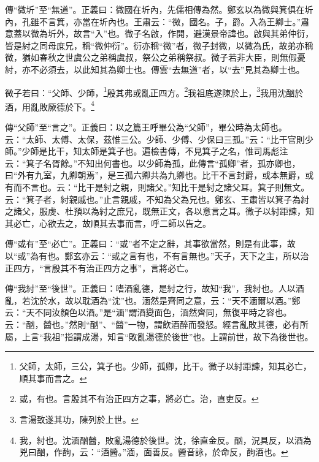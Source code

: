 {\noindent\zhuan{}\fzbyks 傳“微圻”至“無道”。正義曰：微國在圻內，先儒相傳為然。鄭玄以為微與箕俱在圻內，孔雖不言箕，亦當在圻內也。王肅云：“微，國名。子，爵。入為王卿士。”肅意蓋以微為圻外，故言“入”也。微子名啟，作開，避漢景帝諱也。啟與其弟仲衍，皆是紂之同母庶兄，稱“微仲衍”。衍亦稱“微”者，微子封微，以微為氏，故弟亦稱微，猶如春秋之世虞公之弟稱虞叔，祭公之弟稱祭叔。微子若非大臣，則無假憂紂，亦不必須去，以此知其為卿士也。傳雲“去無道”者，以“去”見其為卿士也。 \par}

微子若曰：“父師、少師，\footnote{父師，太師，三公，箕子也。少師，孤卿，比干。微子以紂距諫，知其必亡，順其事而言之。}殷其弗或亂正四方。\footnote{或，有也。言殷其不有治正四方之事，將必亡。治，直吏反。}我祖底遂陳於上，\footnote{言湯致遂其功，陳列於上世。}我用沈酗於酒，用亂敗厥德於下。\footnote{我，紂也。沈湎酗醟，敗亂湯德於後世。沈，徐直金反。酗，況具反，以酒為兇曰酗，作䣱，云：“酒醟。”湎，面善反。醟音詠，於命反，䣱酒也。}


{\noindent\zhuan{}\fzbyks 傳“父師”至“言之”。正義曰：以之篇王呼畢公為“父師”，畢公時為太師也。云：“太師、太傅、太保，茲惟三公。少師、少傅、少保曰三孤。”云：“比干官則少師。”少師是比干，知太師是箕子也。遍檢書傳，不見箕子之名，惟司馬彪注云：“箕子名胥餘。”不知出何書也。以少師為孤，此傳言“孤卿”者，孤亦卿也，曰“外有九室，九卿朝焉”，是三孤六卿共為九卿也。比干不言封爵，或本無爵，或有而不言也。云：“比干是紂之親，則諸父。”知比干是紂之諸父耳。箕子則無文。云：“箕子者，紂親戚也。”止言親戚，不知為父為兄也。鄭玄、王肅皆以箕子為紂之諸父，服虔、杜預以為紂之庶兄，既無正文，各以意言之耳。微子以紂距諫，知其必亡，心欲去之，故順其去事而言，呼二師以告之。 \par}

{\noindent\zhuan{}\fzbyks 傳“或有”至“必亡”。正義曰：“或”者不定之辭，其事欲當然，則是有此事，故以“或”為有也。鄭玄亦云：“或之言有也，不有言無也。”天子，天下之主，所以治正四方，“言殷其不有治正四方之事”，言將必亡。 \par}

{\noindent\zhuan{}\fzbyks 傳“我紂”至“後世”。正義曰：嗜酒亂德，是紂之行，故知“我”，我紂也。人以酒亂，若沈於水，故以耽酒為“沈”也。湎然是齊同之意，云：“天不湎爾以酒。”鄭云：“天不同汝顏色以酒。”是“湎”謂酒變面色，湎然齊同，無復平時之容也。云：“酗，醟也。”然則“酗”、“醟”一物，謂飲酒醉而發怒。經言亂敗其德，必有所屬，上言“我祖”指謂成湯，知言“敗亂湯德於後世”也。上謂前世，故下為後世也。 \par}

